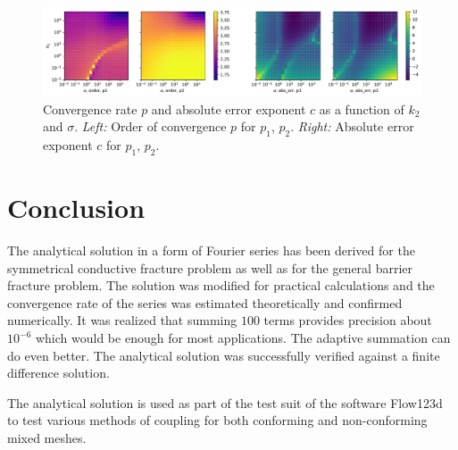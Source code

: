 \documentclass{elsarticle}
\begin{document}
\begin{figure}
  \label{fig:barrier_rate}
  \centering
  \includegraphics[width=\textwidth]{./barrier_conv_rate.pdf}
  \caption{Convergence rate $p$ and absolute error exponent $c$ as a function of $k_2$ and $\sigma$. 
  {\it Left:} Order of convergence $p$ for $p_1$, $p_2$.
  {\it Right:} Absolute error exponent $c$ for $p_1$, $p_2$.}
\end{figure}


\section{Conclusion}
\label{sec:conclusion}
The analytical solution in a form of Fourier series has been derived for the symmetrical conductive fracture problem as well as for 
the general barrier fracture problem. The solution was modified for practical calculations and the convergence rate of the series was estimated theoretically and 
confirmed numerically. It was realized that summing $100$ terms provides precision about $10^{-6}$ which would be enough for most applications.
The adaptive summation can do even better. The analytical solution was successfully verified against a finite difference solution.  

The analytical solution is used as part of the test suit of the software Flow123d \cite{flow123d} to test various methods of coupling for both conforming 
and non-conforming mixed meshes.



  
 
\end{document}
